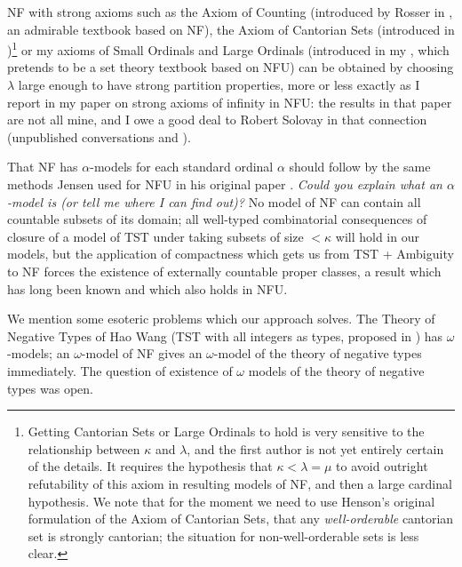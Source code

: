 \documentclass[112pt]{article}
\theoremstyle{definition}
\theoremstyle{remark}
\newcommand{\rk}[1]{{\color{blue}\sl #1}}
\newcommand{\rk}[1]{}
\begin{document}
NF with strong axioms such as the Axiom of Counting (introduced by Rosser in \cite{rosser}, an admirable textbook based on NF), the Axiom of Cantorian Sets (introduced in \cite{henson})\footnote{Getting Cantorian Sets or Large Ordinals to hold is very sensitive to the relationship between $\kappa$ and $\lambda$, and the first author is not yet entirely certain of the details.  It requires the hypothesis that $\kappa<\lambda=\mu$ to avoid outright refutability of this axiom in resulting models of NF, and then a large cardinal hypothesis.  We note that for the moment we need to use Henson's original formulation of the Axiom of Cantorian Sets, that any {\em well-orderable\/} cantorian set is strongly cantorian;  the situation for non-well-orderable sets is less clear.} or my axioms of Small Ordinals and Large Ordinals (introduced in  my \cite{mybook}, which pretends to be a set theory textbook based on NFU) can be obtained by choosing $\lambda$ large enough to have strong partition properties, more or less exactly as I report in my paper \cite{strongaxioms} on strong axioms of infinity in NFU:  the results in that paper are not all mine, and I owe a good deal to Robert Solovay in that connection (unpublished conversations and \cite{nfub}).

That NF has $\alpha$-models for each standard ordinal $\alpha$ should follow by the same methods Jensen used for NFU in his original paper \cite{nfu}.  \rk{Could you explain what an $\alpha$-model is (or tell me where I can find out)?} 
  No model of NF can contain all countable subsets of its domain;  all well-typed combinatorial consequences
of closure of a model of TST under taking subsets of size $<\kappa$ will hold in our models, but the application of compactness which gets us from TST + Ambiguity to NF forces the existence of externally countable proper classes, a result which has long been known and which also holds in NFU.

We mention some esoteric problems which our approach solves.  The Theory of Negative Types of Hao Wang (TST with all integers as types, proposed in \cite{tnt})  has $\omega$-models;  an $\omega$-model of NF gives an $\omega$-model of the theory of negative types  immediately.  The question of existence of $\omega$ models of the theory of negative types was open.
\end{document}
